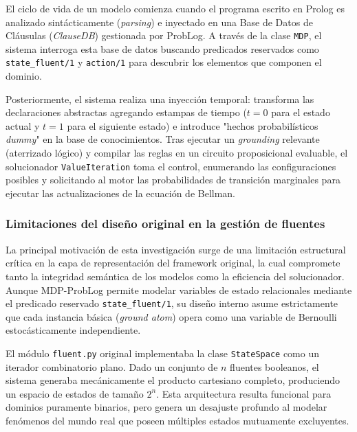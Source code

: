 El ciclo de vida de un modelo comienza cuando el programa escrito en Prolog es analizado sintácticamente (\textit{parsing}) e inyectado en una Base de Datos de Cláusulas (\textit{ClauseDB}) gestionada por ProbLog. A través de la clase \texttt{MDP}, el sistema interroga esta base de datos buscando predicados reservados como \texttt{state\_fluent/1} y \texttt{action/1} para descubrir los elementos que componen el dominio. 

Posteriormente, el sistema realiza una inyección temporal: transforma las declaraciones abstractas agregando estampas de tiempo ($t=0$ para el estado actual y $t=1$ para el siguiente estado) e introduce "hechos probabilísticos \textit{dummy}" en la base de conocimientos. Tras ejecutar un \textit{grounding} relevante (aterrizado lógico) y compilar las reglas en un circuito proposicional evaluable, el solucionador \texttt{ValueIteration} toma el control, enumerando las configuraciones posibles y solicitando al motor las probabilidades de transición marginales para ejecutar las actualizaciones de la ecuación de Bellman.

\subsubsection{Limitaciones del diseño original en la gestión de fluentes}
\label{sec:di-limitaciones-gestion}

La principal motivación de esta investigación surge de una limitación estructural crítica en la capa de representación del framework original, la cual compromete tanto la integridad semántica de los modelos como la eficiencia del solucionador. Aunque MDP-ProbLog permite modelar variables de estado relacionales mediante el predicado reservado \texttt{state\_fluent/1}, su diseño interno asume estrictamente que cada instancia básica (\textit{ground atom}) opera como una variable de Bernoulli estocásticamente independiente.

El módulo \texttt{fluent.py} original implementaba la clase \texttt{StateSpace} como un iterador combinatorio plano. Dado un conjunto de $n$ fluentes booleanos, el sistema generaba mecánicamente el producto cartesiano completo, produciendo un espacio de estados de tamaño $2^n$. Esta arquitectura resulta funcional para dominios puramente binarios, pero genera un desajuste profundo al modelar fenómenos del mundo real que poseen múltiples estados mutuamente excluyentes.

